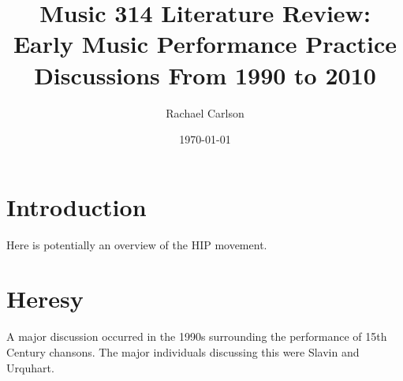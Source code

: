 \documentclass[12pt]{article}
\author{Rachael Carlson}
\title{Music 314 Literature Review: Early Music Performance Practice Discussions From 1990 to 2010}
\date{\today}
\begin{document}
\maketitle

\section{Introduction}
\label{sec:introduction}
Here is potentially an overview of the HIP movement.\autocite{murphy2008}
\section{Heresy}
\label{sec:heresy}
A major discussion occurred in the 1990s surrounding the performance of 15th
Century chansons. The major individuals discussing this were
Slavin\autocite{slavin1991} and Urquhart\autocite{urquhart2011}.

\clearpage
\printbibliography
\end{document}
